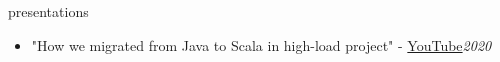 \documentclass{resume}
\begin{document}
\begin{ResumeSection}{presentations}
    \begin{itemize}
        \item "How we migrated from Java to Scala in high-load project" - \href{https://www.youtube.com/watch?v=7hEcX6lynYU}{YouTube}\hfill\em{2020}
    \end{itemize}
\end{ResumeSection}
\end{document}

